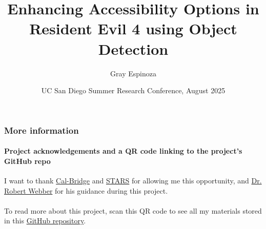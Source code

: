 \documentclass[aspectratio=43]{beamer}
\title[Accessibility in Resident Evil 4]{Enhancing Accessibility
Options in Resident Evil 4 using Object Detection}
\author{Gray Espinoza}
\institute{California State University,\\Fullerton}
\date[13 August 2025]{UC San Diego Summer Research Conference, August 2025}
\begin{document}
\begin{frame}[plain]
  \titlepage
\end{frame}

\begin{frame}
  \frametitle{More information}
  \framesubtitle{Project acknowledgements and a QR code linking to
  the project's GitHub repo}

  I want to thank \href{https://calbridge.org}{Cal-Bridge} and
  \href{https://grad.ucsd.edu/oar2/oar2office/programs/undergraduate-programs/stars}{STARS}
  for allowing me this opportunity, and
  \href{https://sites.google.com/ucsd.edu/rwebber}{Dr. Robert Webber}
  for his guidance during this project.
  \\~\\

  To read more about this project, scan this QR code to see all my
  materials stored in this
  \href{https://github.com/grayespinoza/cbsp25}{GitHub repository}.
  \\~\\

  \begin{center}
  \end{center}
\end{frame}
\end{document}
